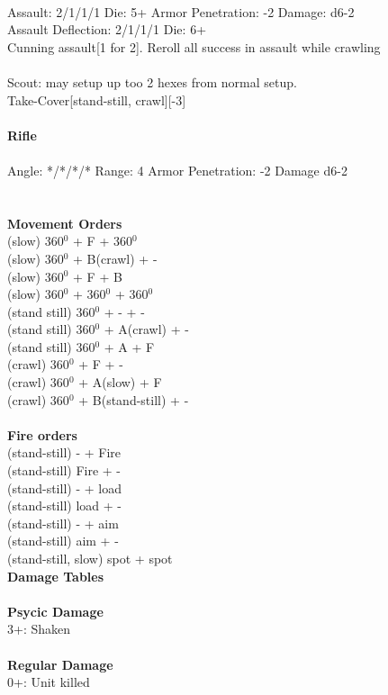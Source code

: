 \ \\
Assault: 2/1/1/1 Die: 5+ Armor Penetration: -2 Damage: d6-2 \\
Assault Deflection: 2/1/1/1 Die: 6+\\
\indent Cunning assault[1 for 2]. Reroll all success in assault while crawling \\
\ \\
Scout: may setup up too 2 hexes from normal setup. \\ Take-Cover[stand-still, crawl][-3]
\ \\
\ \\
{\bf Rifle } \\
\ \\
Angle: */*/*/* Range: 4 Armor Penetration: -2 Damage d6-2 \\
\indent  \\





\ \\ {\bf Movement Orders } \\
(slow) 360$^0$ + F + 360$^0$ \\
(slow) 360$^0$ + B(crawl) + - \\
(slow) 360$^0$ + F + B \\
(slow) 360$^0$ + 360$^0$ + 360$^0$ \\
(stand still) 360$^0$ + - + -  \\
(stand still) 360$^0$ + A(crawl) + - \\
(stand still) 360$^0$ + A + F \\
(crawl) 360$^0$ + F + - \\
(crawl) 360$^0$ + A(slow) + F \\
(crawl) 360$^0$ + B(stand-still) + - \\
\ \\ {\bf Fire orders } \\
(stand-still) - + Fire \\
(stand-still) Fire + -  \\
(stand-still) - + load \\
(stand-still) load + - \\
(stand-still) - + aim \\
(stand-still) aim + -  \\
(stand-still, slow) spot + spot \\



{\bf Damage Tables} \\
\ \\ {\bf Psycic Damage } \\
3+: Shaken \\
\ \\ {\bf Regular Damage } \\
0+: Unit killed \\


